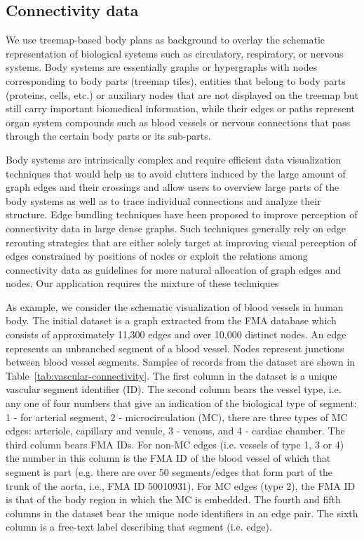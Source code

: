 \subsection{Connectivity data}

We use treemap-based body plans as background to overlay the schematic representation of biological systems such as
circulatory, respiratory, or nervous systems. Body systems are essentially graphs or hypergraphs with nodes corresponding to body parts (treemap tiles), entities that belong to body parts (proteins, cells, etc.) or auxiliary nodes that are not displayed on the treemap but still carry important biomedical information, while their edges or paths represent organ system compounds such as blood vessels or nervous connections that pass through the certain body parts or its sub-parts.

Body systems are intrinsically complex and require efficient data visualization techniques that would help us to avoid clutters induced by the large amount of graph edges and their crossings and allow users to overview large parts of the body systems as well as to trace individual connections and analyze their structure. Edge bundling techniques have been proposed to improve perception of connectivity data in large dense graphs.
Such techniques generally rely on edge rerouting strategies that are either solely target at improving visual perception of edges constrained by positions of nodes or exploit the relations among connectivity data as guidelines for more natural allocation of graph edges and nodes. Our application requires the mixture of these techniques

As example, we consider the schematic visualization of blood vessels in human body.
The initial dataset is a graph extracted from the FMA database which consists of approximately 11,300 edges and over 10,000 distinct nodes.
An edge represents an unbranched segment of a blood vessel. Nodes represent junctions between blood vessel segments.
Samples of records from the dataset are shown in Table~\ref{tab:vascular-connectivity}. The first column in the dataset is a unique vascular segment identifier (ID). The second column bears the vessel type, i.e. any one of four numbers that give an indication of the biological type of segment:
1 - for arterial segment, 2 - microcirculation (MC), there are three types of MC edges: arteriole, capillary and venule, 3 - venous, and 4 - cardiac chamber.
The third column bears FMA IDs. For non-MC edges (i.e. vessels of type 1, 3 or 4) the number in this column is the FMA ID of the blood vessel of
which that segment is part (e.g. there are over 50 segments/edges that form part of the trunk of the aorta, i.e., FMA ID 50010931). For MC edges (type 2), the FMA ID is that of the body region in which the MC is embedded. The fourth and fifth columns in the dataset bear the unique node identifiers in an edge pair.
The sixth column is a free-text label describing that segment (i.e. edge).

